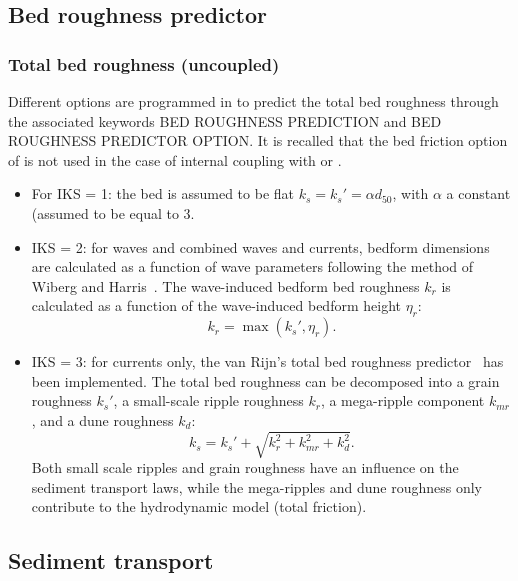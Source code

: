 \subsection{Bed roughness predictor}
\subsubsection{Total bed roughness (uncoupled)}
Different options are programmed in \sisyphe to predict the total bed
roughness through the associated keywords {\ttfamily BED ROUGHNESS PREDICTION} and {\ttfamily BED ROUGHNESS PREDICTOR OPTION}. It is recalled that the bed friction option of \sisyphe is not
used in the case of internal coupling with \teldd or \telddd.
\begin{itemize}
\item For {\ttfamily IKS = 1}: the bed is assumed to be flat $k_s = k_s'= \alpha d_{50}$, with $\alpha$ a constant (assumed to be equal to $3$.
\item {\ttfamily IKS = 2}: for waves and combined waves and currents, bedform dimensions are calculated
as a function of wave parameters following the method of Wiberg and Harris~\cite{WibergHarris}. 
The wave-induced bedform bed roughness $k_r$ is calculated as a function of the wave-induced bedform 
height $\eta_r$: 
\begin{equation}
k_r = \max(k_s', \eta_r).
\end{equation}
\item {\ttfamily IKS = 3}: for currents only, the van Rijn's total bed roughness predictor~\cite{vanRijn07, Huybrechts10} has been implemented. 
The total bed roughness can be decomposed into a grain
roughness $k_s'$, a small-scale ripple roughness $k_r$, a mega-ripple 
component $k_{mr}$, and a dune roughness $k_d$:
\begin{equation}\label{eq:totalbedroughness}
k_s = k_s' + \sqrt{k_r^2 + k_{mr}^2 + k_d^2}. 
\end{equation}
Both small scale ripples and grain roughness have an influence on the
sediment transport laws, while the mega-ripples and dune roughness only
contribute to the hydrodynamic model (total friction). 

\end{itemize}





\subsection{Sediment transport}
